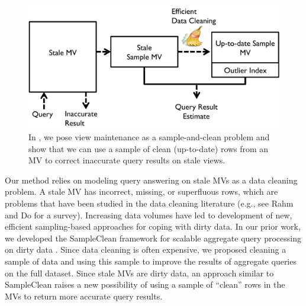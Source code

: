 
\begin{figure}[t]
\centering
 \includegraphics[scale=0.29]{figs/sys-arch.pdf} \vspace{-.25em}
 \caption{In \svc, we pose view maintenance as a sample-and-clean problem and show that we can use a sample of clean (up-to-date) rows from an MV to correct inaccurate query results on stale views.\label{sys-arch}}\vspace{-1.75em}
\end{figure}

Our method relies on modeling query answering on stale MVs as a data cleaning problem.
A stale MV has incorrect, missing, or superfluous rows, which are problems that have been studied in the data cleaning literature (e.g., see Rahm and Do for a survey\cite{rahm2000data}).
Increasing data volumes have led to development of new, efficient sampling-based approaches for coping with dirty data.   
In our prior work, we developed the SampleClean framework for scalable aggregate query processing on dirty data \cite{wang1999sample}.
Since data cleaning is often expensive, we proposed cleaning a sample of data and using this sample to improve the results of aggregate queries on the full dataset.
Since stale MVs are dirty data, an approach similar to SampleClean raises a new possibility of using a sample of ``clean'' rows in the MVs to return more accurate query results.

\vspace{0.5em}

